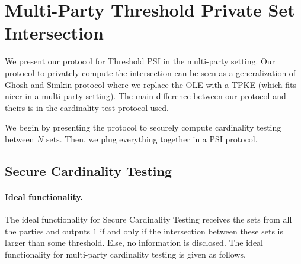\section{Multi-Party Threshold Private Set Intersection}
\label{sec:mppsi}

We present our protocol for Threshold PSI in the multi-party setting. Our protocol to privately compute the intersection can be seen as a generalization of Ghosh and Simkin protocol \cite{C:GhoSim19} where we replace the OLE with a TPKE (which fits nicer in a multi-party setting). The main difference between our protocol and theirs is in  the cardinality test protocol used.

We begin by presenting the protocol to securely compute cardinality testing between $N$ sets. Then, we plug everything together in a PSI protocol.

\subsection{Secure Cardinality Testing}


\paragraph{Ideal functionality.} The ideal functionality for Secure Cardinality Testing receives the sets from all the parties and outputs $1$ if and only if the intersection between these sets is larger than some threshold. Else, no information is disclosed. The ideal functionality for multi-party cardinality testing is given as follows.
\begin{center}
\end{center}


